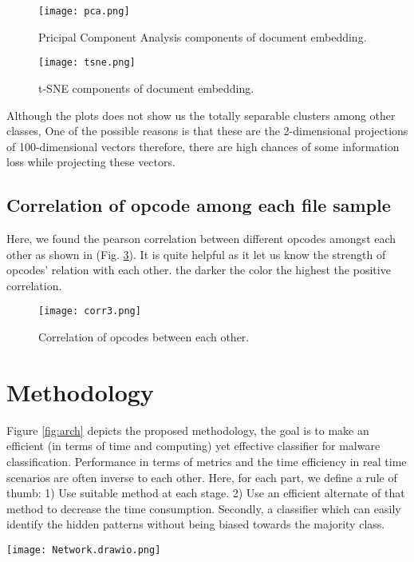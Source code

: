 \documentclass[conference]{IEEEtran}
\begin{document}
\begin{figure}[htbp]
\centerline{\texttt{[image: pca.png]}}
\caption{Pricipal Component Analysis components of document embedding.}
\label{fig4}
\end{figure}

\begin{figure}[htbp]
\centerline{\texttt{[image: tsne.png]}}
\caption{t-SNE components of document embedding.}
\label{fig5}
\end{figure}

Although the plots does not show us the totally separable clusters among other classes, One of the possible reasons is that these are the 2-dimensional projections of 100-dimensional vectors therefore, there are high chances  of some information loss while projecting these vectors.

\subsection{Correlation of opcode among each file sample}
Here, we found the pearson correlation \cite{b10} between different opcodes amongst each other as shown in (Fig. \ref{fig6}). It is quite helpful as it let us know the strength of opcodes' relation with each other. the darker the color the highest the positive correlation.

\begin{figure}[htbp]
\centerline{\texttt{[image: corr3.png]}}
\caption{Correlation of opcodes between each other.}
\label{fig6}
\end{figure}

\section{Methodology}
Figure \ref{fig:arch} depicts the proposed methodology, the goal is to make an efficient (in terms of time and computing) yet effective classifier for malware classification. Performance in terms of metrics and the time efficiency in real time scenarios are often inverse to each other. Here, for each part, we define a rule of thumb: 1) Use suitable method at each stage. 2) Use an efficient alternate of that method to decrease the time consumption. Secondly, a classifier which can easily identify the hidden patterns without being biased towards the majority class.
\begin{figure*}
    \centering
    \texttt{[image: Network.drawio.png]}
    \caption{Sequential Embedding-based Attentive Classifier: Our proposed Model}
    \label{fig:arch}
\end{figure*}
\end{document}
